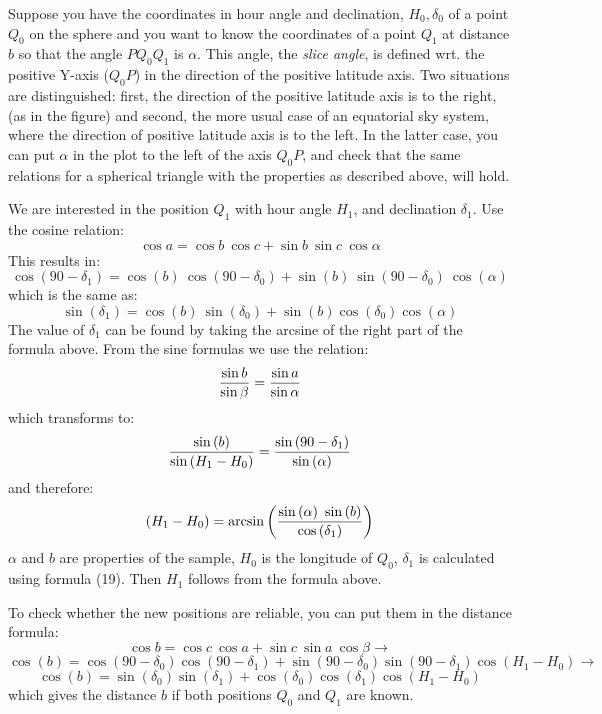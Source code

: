 \documentclass[11pt,a4paper]{article}
\newcommand{\sinb}[1]{\sin \left( #1 \right)}
\newcommand{\cosb}[1]{\cos \left( #1 \right)}
\newcommand{\asinb}[1]{\arcsin \left( #1 \right)}
\begin{document}
 
Suppose you have the coordinates in hour angle and declination, 
$H_0, \delta_0$ of a point $Q_0$
on the sphere and you want to know the coordinates of a point $Q_1$ at 
distance $b$ so that the angle $PQ_0Q_1$ is $\alpha$.
This angle, the {\it slice angle}, is defined wrt. the positive Y-axis ($Q_0P$) in the 
direction of the positive latitude axis. Two situations are distinguished:
first, the direction of the positive latitude axis is to the right,
(as in the figure)
and second, the more usual case of an equatorial sky system, 
where the direction of positive latitude axis is to the left.
In the latter case, you can put $\alpha$ in the plot to the 
left of the axis $Q_0P$, and check that the same relations 
for a spherical triangle with the properties as described above,
will hold.

 
We are interested in the position $Q_1$ with hour angle $H_1$, and declination $\delta_1$. 
Use the cosine relation:
$$\cos a = \cos b\ \cos c + \sin b\ \sin c\ \cos \alpha $$
This results in:
$$\cosb{90-\delta_1} = \cosb{b}\ \cosb{90-\delta_0} +
 \sinb{b}\ \sinb{90-\delta_0}\ \cosb{\alpha} $$
which is the same as:
\begin{equation}
\sinb{\delta_1} = \cosb{b}\ \sinb{\delta_0} + \sinb{b} \cosb{\delta_0} \cosb{\alpha} 
\end{equation}
The value of $\delta_1$ can be found by taking the arcsine of the right part 
of the formula above.
From the sine formulas we use the relation:
$${\sin b \over{\sin \beta}} = {\sin a \over{\sin \alpha}}$$
which transforms to:
\begin{equation}
{\sinb{b} \over{\sinb{H_1-H_0}}} = {\sinb{90-\delta_1} \over{\sinb{\alpha}}}
\end{equation}
and therefore:
\begin{equation}
(H_1-H_0) = \asinb{{{\sinb{\alpha}\ \sinb{b}}\over{\cosb{\delta_1}}}}
\end{equation}
$\alpha$ and $b$ are properties of the sample, $H_0$ is the longitude
of $Q_0$, $\delta_1$ is calculated using formula (19). Then $H_1$
follows from the formula above.

 
To check whether the new positions are reliable, you can put them 
in the distance formula:
$$\cos b = \cos c\ \cos a + \sin c\ \sin a\ \cos \beta \rightarrow$$
$$\cosb{b} = \cosb{90-\delta_0} \cosb{90-\delta_1} + 
\sinb{90-\delta_0} \sinb{90-\delta_1}\cosb{H_1-H_0} \rightarrow$$
\begin{equation}
\cosb{b} = \sinb{\delta_0} \sinb{\delta_1}+\cosb{\delta_0} \cosb{\delta_1} \cosb{H_1-H_0}
\end{equation}
which gives the distance $b$ if both positions $Q_0$ and $Q_1$ are known.
\end{document}
